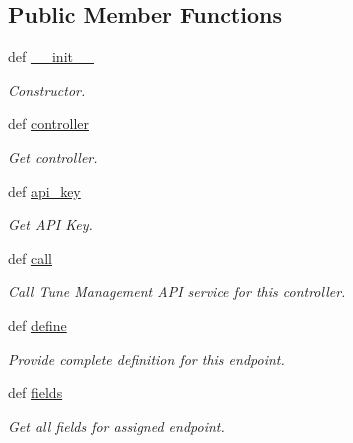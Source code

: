 \subsection*{Public Member Functions}
\begin{DoxyCompactItemize}
\item 
def \hyperlink{classtune_1_1management_1_1endpoints_1_1base_1_1TuneManagementBase_aaaf30eede3cb5b3fd3c161cb6f8dd41a}{\-\_\-\-\_\-init\-\_\-\-\_\-}
\begin{DoxyCompactList}\small\item\em Constructor. \end{DoxyCompactList}\item 
def \hyperlink{classtune_1_1management_1_1endpoints_1_1base_1_1TuneManagementBase_a0b97b7e853b69db1d925bc4794c091f8}{controller}
\begin{DoxyCompactList}\small\item\em Get controller. \end{DoxyCompactList}\item 
def \hyperlink{classtune_1_1management_1_1endpoints_1_1base_1_1TuneManagementBase_a46aee833b1a1d07053c31e3fdba75b83}{api\-\_\-key}
\begin{DoxyCompactList}\small\item\em Get A\-P\-I Key. \end{DoxyCompactList}\item 
def \hyperlink{classtune_1_1management_1_1endpoints_1_1base_1_1TuneManagementBase_a41f81802f37253c41938063641ab4841}{call}
\begin{DoxyCompactList}\small\item\em Call Tune Management A\-P\-I service for this controller. \end{DoxyCompactList}\item 
def \hyperlink{classtune_1_1management_1_1endpoints_1_1base_1_1TuneManagementBase_a030cef567c5456a12b6a5d2ca612e295}{define}
\begin{DoxyCompactList}\small\item\em Provide complete definition for this endpoint. \end{DoxyCompactList}\item 
def \hyperlink{classtune_1_1management_1_1endpoints_1_1base_1_1TuneManagementBase_abf3e64564de650a15b23f5be8b9d8058}{fields}
\begin{DoxyCompactList}\small\item\em Get all fields for assigned endpoint. \end{DoxyCompactList}\item 

\end{DoxyCompactItemize}

